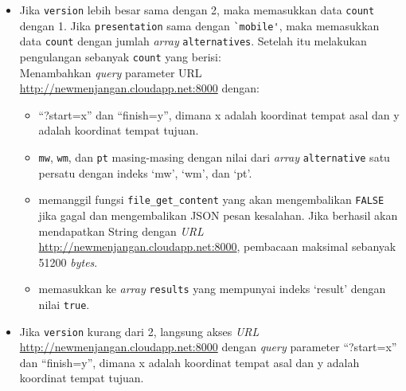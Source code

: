 \begin{itemize}
	\item Jika \verb!version! lebih besar sama dengan 2, maka memasukkan data \verb!count! dengan 1. Jika \verb!presentation! sama dengan \verb!`mobile'!, maka memasukkan data \verb!count! dengan jumlah \textit{array} \verb!alternatives!. Setelah itu melakukan pengulangan sebanyak \verb!count! yang berisi:\\
		Menambahkan \textit{query} parameter URL \url{http://newmenjangan.cloudapp.net:8000} dengan:
		\begin{itemize}
			\item 	``?start=x'' dan ``finish=y'', dimana x adalah koordinat tempat asal dan y adalah koordinat tempat tujuan.
			\item \verb!mw!, \verb!wm!, dan \verb!pt! masing-masing dengan nilai dari \textit{array} \verb!alternative! satu persatu dengan indeks `mw', `wm', dan `pt'.
			\item memanggil fungsi \verb!file_get_content! yang akan mengembalikan \verb!FALSE! jika gagal dan mengembalikan JSON pesan kesalahan. Jika berhasil akan mendapatkan String dengan \textit{URL} \url{http://newmenjangan.cloudapp.net:8000}, pembacaan maksimal sebanyak 51200 \textit{bytes}.
			\item memasukkan ke \textit{array} \verb!results! yang mempunyai indeks `result' dengan nilai \verb!true!.
		\end{itemize}
	\item Jika \verb!version! kurang dari 2, langsung akses \textit{URL} \url{http://newmenjangan.cloudapp.net:8000} dengan \textit{query} parameter ``?start=x'' dan ``finish=y'', dimana x adalah koordinat tempat asal dan y adalah koordinat tempat tujuan.
\end{itemize}

